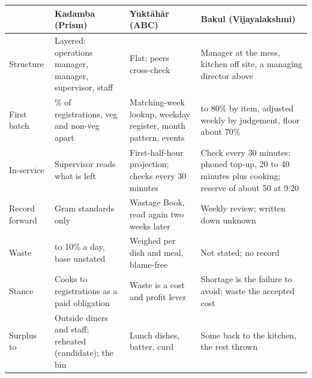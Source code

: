 \documentclass[
  10pt,
  table]{article}
\newcounter{none} %
\begin{document}
{\def\LTcaptype{none} %
\begin{longtable}[]{@{}
  >{\raggedright\arraybackslash}p{}
  >{\raggedright\arraybackslash}p{}
  >{\raggedright\arraybackslash}p{}
  >{\raggedright\arraybackslash}p{}@{}}
\toprule\noalign{}
\begin{minipage}[b]{\linewidth}\raggedright
\cellcolor{pblue}\color{white}\bfseries 
\end{minipage} & \begin{minipage}[b]{\linewidth}\raggedright
\cellcolor{pblue}\color{white}\bfseries Kadamba (Prism)
\end{minipage} & \begin{minipage}[b]{\linewidth}\raggedright
\cellcolor{pblue}\color{white}\bfseries Yuktāhār (ABC)
\end{minipage} & \begin{minipage}[b]{\linewidth}\raggedright
\cellcolor{pblue}\color{white}\bfseries Bakul (Vijayalakshmi)
\end{minipage} \\
\midrule\noalign{}
\endhead
\bottomrule\noalign{}
\endlastfoot
Structure & Layered: operations manager, manager, supervisor, staff & Flat; peers cross-check & Manager at the mess, kitchen off site, a managing director above \\
First batch & 70\% of registrations, veg and non-veg apart & Matching-week lookup, weekday register, month pattern, events & 70 to 80\% by item, adjusted weekly by judgement, floor about 70\% \\
In-service & Supervisor reads what is left & First-half-hour projection; checks every 30 minutes & Check every 30 minutes; phoned top-up, 20 to 40 minutes plus cooking; reserve of about 50 at 9:20 \\
Record forward & Gram standards only & Wastage Book, read again two weeks later & Weekly review; written down unknown \\
Waste & 5 to 10\% a day, base unstated & Weighed per dish and meal, blame-free & Not stated; no record \\
Stance & Cooks to registrations as a paid obligation & Waste is a cost and profit lever & Shortage is the failure to avoid; waste the accepted cost \\
Surplus to & Outside diners and staff; reheated (candidate); the bin & Lunch dishes, batter, curd & Some back to the kitchen, the rest thrown \\
\end{longtable}
}
\end{document}
